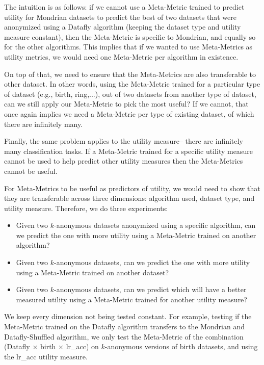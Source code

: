 The intuition is as follows: if we cannot use a Meta-Metric trained to predict utility for Mondrian datasets to predict the best of two datasets that were anonymized using a Datafly algorithm (keeping the dataset type and utility measure constant), then the Meta-Metric is specific to Mondrian, and equally so for the other algorithms. This implies that if we wanted to use Meta-Metrics as utility metrics, we would need one Meta-Metric per algorithm in existence. 

On top of that, we need to ensure that the Meta-Metrics are also transferable to other dataset. In other words, using the Meta-Metric trained for a particular type of dataset (e.g., birth, ring,...), out of two datasets from another type of dataset, can we still apply our Meta-Metric to pick the most useful? If we cannot, that once again implies we need a Meta-Metric per type of existing dataset, of which there are infinitely many.

Finally, the same problem applies to the utility measure-- there are infinitely many classification tasks. If a Meta-Metric trained for a specific utility measure cannot be used to help predict other utility measures then the Meta-Metrics cannot be useful.

For Meta-Metrics to be useful as predictors of utility, we would need to show that they are transferable across three dimensions: algorithm used, dataset type, and utility measure. Therefore, we do three experiments:

\begin{itemize}
    \item Given two $k$-anonymous datasets anonymized using a specific algorithm, can we predict the one with more utility using a Meta-Metric trained on another algorithm?
    
    \item Given two $k$-anonymous datasets, can we predict the one with more utility using a Meta-Metric trained on another dataset?
    
    \item Given two $k$-anonymous datasets, can we predict which will have a better measured utility using a Meta-Metric trained for another utility measure?
\end{itemize}

We keep every dimension not being tested constant. For example, testing if the Meta-Metric trained on the Datafly algorithm transfers to the Mondrian and Datafly-Shuffled algorithm, we only test the Meta-Metric of the combination (Datafly $\times$ birth $\times$ lr\_acc) on $k$-anonymous versions of birth datasets, and using the lr\_acc utility measure.

